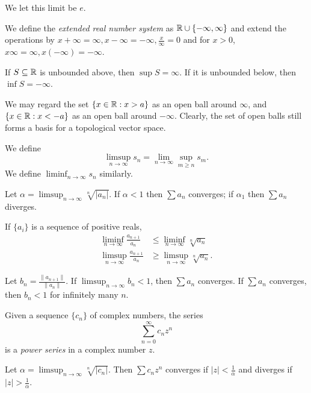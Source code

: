 \begin{defn}
    We let this limit be $e$.
\end{defn}
\begin{defn}
    We define the \emph{extended real number system} as
    $\mathbb{R}\cup\{-\infty,\infty\}$ and extend the operations by
    $x+\infty=\infty,x-\infty=-\infty,\frac x{\infty}=0$
    and for $x>0$, $x\infty=\infty,x(-\infty)=-\infty$.

    If $S\subseteq\mathbb{R}$ is unbounded above, then $\sup S=\infty$. If it is
    unbounded below, then $\inf S=-\infty$.

    We may regard the set $\{x\in\mathbb{R}:x>a\}$ as an open ball around $\infty$, and
    $\{x\in\mathbb{R}:x<-a\}$ as an open ball around $-\infty$. Clearly, the set of
    open balls still forms a basis for a topological vector space.
\end{defn}
\begin{defn}
    We define \[\limsup_{n\to\infty}
    s_n=\lim_{n\to\infty}\sup_{m\ge n} s_m.\]
    We define $\liminf_{n\to\infty} s_n$ similarly.
\end{defn}
\begin{prop}
    Let $\alpha=\limsup_{n\to\infty}\sqrt[n]{|a_n|}$. If $\alpha<1$ then $\sum
    a_n$ converges; if $\alpha_1$ then $\sum a_n$ diverges.
\end{prop}
\begin{prop}
    If $\{a_i\}$ is a sequence of positive reals,
\begin{align*}
    \liminf_{n\to\infty}\frac{a_{n+1}}{a_n}&\le\liminf_{n\to\infty}\sqrt[n]{a_n} \\
    \limsup_{n\to\infty}\frac{a_{n+1}}{a_n}&\ge\limsup_{n\to\infty}\sqrt[n]{a_n}.
\end{align*}
\end{prop}
\begin{cor}
    Let $b_n=\frac{\|a_{n+1}\|}{\|a_n\|}$. If $\limsup_{n\to\infty} b_n<1$,
    then $\sum a_n$ converges. If $\sum a_n$ converges, then $b_n<1$ for
    infinitely many $n$.
\end{cor}
\begin{defn}
    Given a sequence $\{c_n\}$ of complex numbers, the series
    \[\sum_{n=0}^\infty c_n z^n\] is a \emph{power series} in a complex number
    $z$.
\end{defn}
\begin{prop}
    Let $\alpha=\limsup_{n\to\infty}\sqrt[n]{|c_n|}$. Then $\sum c_n z^n$
    converges if $|z|<\frac1\alpha$ and diverges if $|z|>\frac1\alpha$.
\end{prop}

